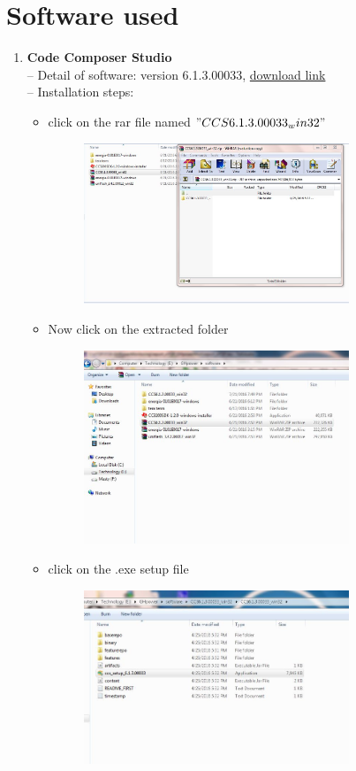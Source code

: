 \documentclass[a4paper,12pt,oneside]{book}
\begin{document}
\section{Software used}
\begin{enumerate}
	\item\textbf{ Code Composer Studio} \\
  -- Detail of software: version 6.1.3.00033, \href{http://www.ti.com}{download link}\\
  -- Installation steps:
  \begin{itemize}
  	\item click on the rar file named $"CCS6.1.3.00033_win32"$
  	  \begin{figure}[h]
  	  	\hspace{2cm}
  	 	\includegraphics[width=300px]{inst1}
  	 \end{figure}
  	 	 \item Now click on the extracted folder
  	  \begin{figure}[h]
  	  		\hspace{2cm}
  	 	\includegraphics[width=300px]{inst2}
  	 \end{figure}
  	 \newpage
  	 \item click on the .exe setup file
  	 \begin{figure}[h]
  	 		\hspace{2cm}
  	  	\includegraphics[width=300px]{inst3}

\end{figure}
\end{itemize}
\end{enumerate}
\end{document}
